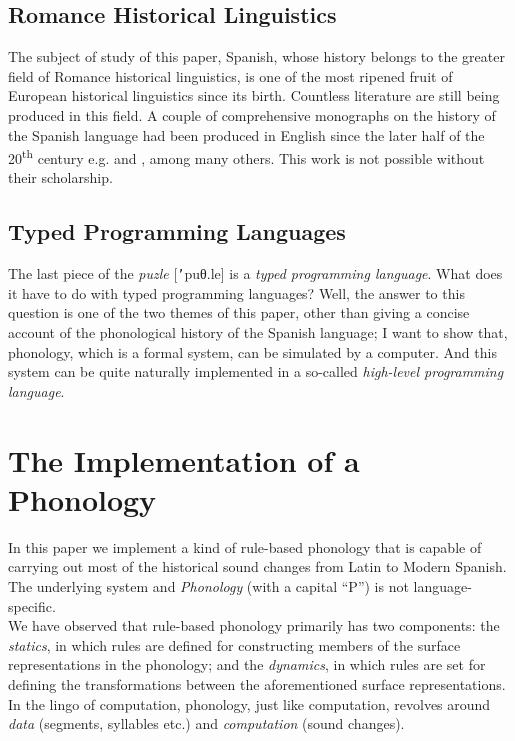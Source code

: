 \documentclass{report}[12pt]
\begin{document}
\subsection{Romance Historical Linguistics}

The subject of study of this paper, Spanish, whose history belongs to the greater field of Romance historical linguistics, is one of the most ripened fruit of European historical linguistics since its birth. Countless literature are still being produced in this field. A couple of comprehensive monographs on the history of the Spanish language had been produced in English since the later half of the 20\textsuperscript{th} century e.g. \cite{penny_spanish} and \cite{lloyd_spanish}, among many others. This work is not possible without their scholarship.

\subsection{Typed Programming Languages}

The last piece of the \emph{puzle} [\texttt{'}puθ.le] is a \emph{typed programming language}. What does it have to do with typed programming languages? Well, the answer to this question is one of the two themes of this paper, other than giving a concise account of the phonological history of the Spanish language; I want to show that, phonology, which is a formal system, can be simulated by a computer. And this system can be quite naturally implemented in a so-called \emph{high-level programming language}.

\section{The Implementation of a Phonology}

In this paper we implement a kind of rule-based phonology that is capable of carrying out most of the historical sound changes from Latin to Modern Spanish. The underlying system and \emph{Phonology} (with a capital ``P'') is not language-specific. \\
We have observed that rule-based phonology primarily has two components: the \emph{statics}, in which rules are defined for constructing members of the surface representations in the phonology; and the \emph{dynamics}, in which rules are set for defining the transformations between the aforementioned surface representations. In the lingo of computation, phonology, just like computation, revolves around \emph{data} (segments, syllables etc.) and \emph{computation} (sound changes).
\end{document}

